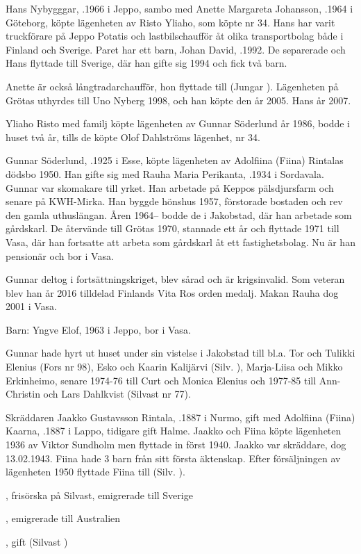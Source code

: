 Hans Nybygggar, .1966 i Jeppo, sambo med Anette Margareta Johansson, .1964 i Göteborg,  köpte lägenheten av Risto Yliaho, som köpte nr 34.  Hans har varit truckförare på Jeppo Potatis och lastbilschaufför åt olika transportbolag både i Finland och Sverige. Paret har ett barn, Johan David, .1992. De separerade och Hans flyttade till Sverige, där han gifte sig 1994 och fick två barn.


Anette  är också långtradarchaufför, hon flyttade till (Jungar    ). Lägenheten på Grötas uthyrdes till Uno Nyberg 1998, och han köpte den år 2005.
Hans \textdied år 2007.


Yliaho Risto med familj köpte lägenheten av Gunnar Söderlund år 1986, bodde i huset två år, tills de köpte Olof Dahlströms lägenhet, nr 34.


Gunnar Söderlund, .1925 i Esse, köpte lägenheten av Adolfiina (Fiina) Rintalas dödsbo 1950. Han gifte sig med Rauha Maria Perikanta, .1934 i Sordavala.  Gunnar var skomakare till yrket. Han arbetade på Keppos pälsdjursfarm och senare på KWH-Mirka. Han byggde hönshus 1957, förstorade bostaden och rev den gamla uthuslängan. Åren 1964-- bodde de i Jakobstad, där han arbetade som gårdskarl. De återvände till Grötas 1970, stannade ett år och flyttade 1971 till Vasa, där han fortsatte  att arbeta som  gårdskarl åt ett fastighetsbolag. Nu är han pensionär och bor i Vasa.

Gunnar deltog i fortsättningskriget, blev sårad och är krigsinvalid. Som veteran blev han år 2016 tilldelad Finlands Vita Ros orden medalj. Makan Rauha dog 2001 i Vasa.

Barn: Yngve Elof,  1963 i Jeppo, bor i Vasa.

Gunnar hade hyrt ut huset under sin vistelse i Jakobstad till bl.a. Tor och Tulikki Elenius (Fors nr 98), Esko och Kaarin Kalijärvi (Silv.     ), Marja-Liisa och Mikko Erkinheimo, senare 1974-76 till Curt och Monica Elenius och 1977-85 till Ann-Christin och Lars Dahlkvist (Silvast nr 77).


Skräddaren Jaakko Gustavsson Rintala, .1887 i Nurmo, gift med Adolfiina (Fiina) Kaarna, .1887 i Lappo, tidigare gift Halme. Jaakko och Fiina  köpte lägenheten 1936 av Viktor Sundholm men flyttade in först 1940. Jaakko var skräddare, dog 13.02.1943.  Fiina hade 3 barn från sitt första äktenskap. Efter försäljningen  av lägenheten 1950 flyttade Fiina till (Silv.     ).
\begin{jhchildren}
  \item {}, frisörska  på Silvast, emigrerade till Sverige
  \item {}, emigrerade till Australien
  \item {}, gift (Silvast      )
\end{jhchildren}



